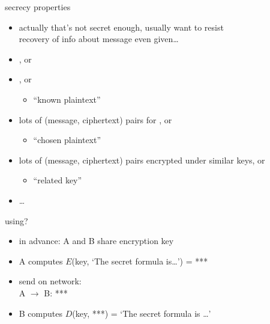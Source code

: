 \begin{frame}{secrecy properties}
    \begin{itemize}
    \item actually that's not secret enough, usually want to resist \\
        recovery of info about message  even given\ldots
    \vspace{.5cm}
    \item {}, or
    \item {}, or
        \begin{itemize}
        \item ``known plaintext''
        \end{itemize}
    \item lots of (message, ciphertext) pairs for \textit{}, or
        \begin{itemize}
        \item ``chosen plaintext''
        \end{itemize}
    \item lots of (message, ciphertext) pairs encrypted under similar keys, or
        \begin{itemize}
        \item ``related key''
        \end{itemize}
    \item \ldots
    \end{itemize}
\end{frame}

\begin{frame}{using?}
    \begin{itemize}
    \item in advance: A and B share encryption key
    \vspace{.5cm}
    \item A computes $E$(key, `The secret formula is\ldots') = ***
    \item send on network: \\
    A $\rightarrow$ B: ***
    \item<2-> B computes $D$(key, ***) = `The secret formula is \ldots'
    \end{itemize}
\end{frame}
